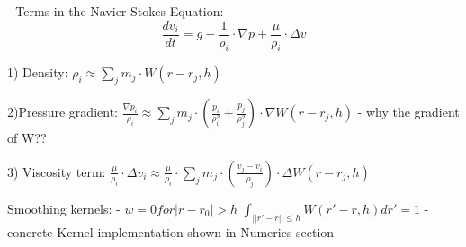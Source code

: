 - Terms in the Navier-Stokes Equation:
\begin{equation} \frac{dv_i}{dt} = g - \frac{1}{\rho_i}\cdot \nabla p + \frac{\mu}{\rho_i} \cdot \Delta  v \end{equation}

1) Density:
$ \rho_i \approx \sum_j m_j \cdot W(r - r_j,h) $

2)Pressure gradient:
$ \frac{\nabla p_i}{\rho_i} \approx \sum_j m_j \cdot (\frac{p_i}{\rho^2_i} + \frac{p_j}{\rho^2_j}) \cdot \nabla W(r - r_j, h) $
- why the gradient of W??

3) Viscosity term:
$ \frac{\mu}{\rho_i} \cdot \Delta v_i \approx \frac{\mu}{\rho_i} \cdot \sum_j m_j \cdot (\frac{v_j - v_i}{\rho_j}) \cdot \Delta W(r - r_j, h) $

Smoothing kernels:
- $ w = 0 for |r - r_0| > h $
$ \int_{||r' - r|| \leq h} W(r' - r, h)dr' = 1 $
- concrete Kernel implementation shown in Numerics section